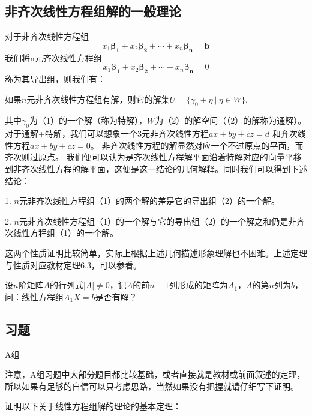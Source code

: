 \subsection{非齐次线性方程组解的一般理论}
对于非齐次线性方程组
\begin{equation}
	x_1\bm{\beta_1}+x_2\bm{\beta_2}+\cdots+x_n\bm{\beta_n}=\bm{b}
\end{equation}
我们将n元齐次线性方程组
\begin{equation}
	x_1\bm{\beta_1}+x_2\bm{\beta_2}+\cdots+x_n\bm{\beta_n}=0
\end{equation}
称为其导出组，则我们有：
\begin{theorem}
	如果$n$元非齐次线性方程组有解，则它的解集$U=\{\gamma_0+\eta\ |\ \eta \in W\}$.
\end{theorem}
其中$\gamma_0$为（1）的一个解（称为特解），$W$为（2）的解空间（（2）的解称为通解）。
对于通解+特解，我们可以想象一个3元非齐次线性方程$ax + by + cz = d$ 和齐次线性方程$ax + by + cz = 0$。
非齐次线性方程的解显然对应一个不过原点的平面，而齐次则过原点。
我们便可以认为是齐次线性方程解平面沿着特解对应的向量平移到非齐次线性方程的解平面，这便是这一结论的几何解释。同时我们可以得到下述结论：

1. $n$元非齐次线性方程组（1）的两个解的差是它的导出组（2）的一个解。

2. $n$元非齐次线性方程组（1）的一个解与它的导出组（2）的一个解之和仍是非齐次线性方程组（1）的一个解。

这两个性质证明比较简单，实际上根据上述几何描述形象理解也不困难。上述定理与性质对应教材定理6.3，可以参看。
\begin{example}
	设$n$阶矩阵$A$的行列式$|A|\neq 0$，记$A$的前$n-1$列形成的矩阵为$A_1$，$A$的第$n$列为$b$，
	问：线性方程组$A_1X=b$是否有解？
\end{example}

\subsection{习题}
\centerline{\heiti A组}
注意，A组习题中大部分题目都比较基础，或者直接就是教材或前面叙述的定理，所以如果有足够的自信可以只考虑思路，当然如果没有把握就请仔细写下证明。

证明以下关于线性方程组解的理论的基本定理：

